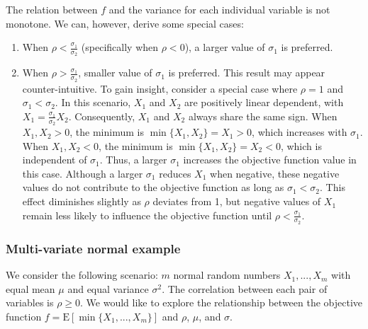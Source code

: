 \documentclass[opre,sglanonrev]{informs4}
\begin{document}
The relation between $f$ and the variance for each individual variable is not monotone. We can, however, derive some special cases:
	\begin{enumerate}
		\item When $\rho<\frac{\sigma_1}{\sigma_2}$ (specifically when $\rho<0$), a larger value of $\sigma_1$ is preferred.
		\item When $\rho>\frac{\sigma_1}{\sigma_2}$, smaller value of $\sigma_1$ is preferred. This result may appear counter-intuitive. To gain insight, consider a special case where $\rho = 1$ and $\sigma_1<\sigma_2$. In this scenario, $X_1$ and $X_2$ are positively linear dependent, with $ X_1 = \frac{\sigma_1}{\sigma_2} X_2$. Consequently, $X_1$ and $X_2$ always share the same sign. When $X_1, X_2 > 0$, the minimum is $\min\{X_1, X_2\} = X_1 > 0$, which increases with $\sigma_1$. When $X_1, X_2 < 0$, the minimum is $\min\{X_1, X_2\} = X_2 < 0$, which is independent of $\sigma_1$. Thus, a larger $\sigma_1$ increases the objective function value in this case. Although a larger $\sigma_1$ reduces $X_1$ when negative, these negative values do not contribute to the objective function as long as $\sigma_1 < \sigma_2$. This effect diminishes slightly as $\rho$ deviates from 1, but negative values of $X_1$ remain less likely to influence the objective function until $\rho < \frac{\sigma_1}{\sigma_2}$.
	\end{enumerate}


\subsubsection{Multi-variate normal example}
\label{multi-variate}

We consider the following scenario: $m$ normal random numbers $X_1,...,X_m$ with equal mean $\mu$ and equal variance $\sigma^2$. The correlation between each pair of variables is $\rho\geq 0$. We would like to explore the relationship between the objective function  $f = \text{E}[\min\{X_1,...,X_m\}]$ and $\rho$, $\mu$, and $\sigma$.
\end{document}
